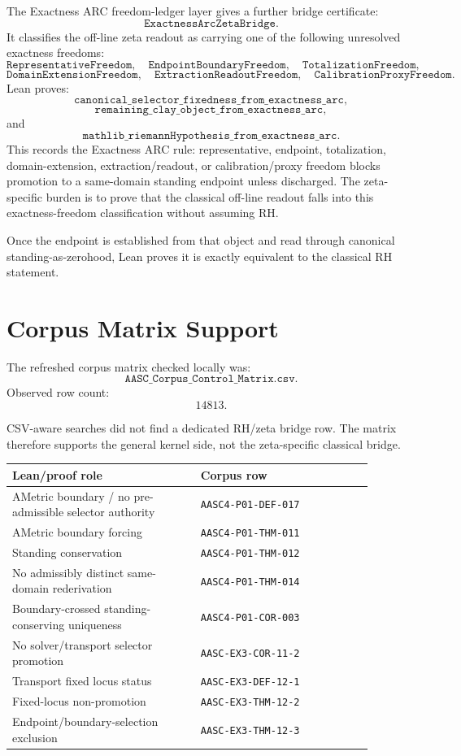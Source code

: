 \documentclass[11pt]{article}
\begin{document}
The Exactness ARC freedom-ledger layer gives a further bridge certificate:
\[
\texttt{ExactnessArcZetaBridge}.
\]
It classifies the off-line zeta readout as carrying one of the following
unresolved exactness freedoms:
\[
\texttt{RepresentativeFreedom},\quad
\texttt{EndpointBoundaryFreedom},\quad
\texttt{TotalizationFreedom},
\]
\[
\texttt{DomainExtensionFreedom},\quad
\texttt{ExtractionReadoutFreedom},\quad
\texttt{CalibrationProxyFreedom}.
\]
Lean proves:
\[
\texttt{canonical\_selector\_fixedness\_from\_exactness\_arc},
\]
\[
\texttt{remaining\_clay\_object\_from\_exactness\_arc},
\]
and
\[
\texttt{mathlib\_riemannHypothesis\_from\_exactness\_arc}.
\]
This records the Exactness ARC rule: representative, endpoint, totalization,
domain-extension, extraction/readout, or calibration/proxy freedom blocks
promotion to a same-domain standing endpoint unless discharged.  The
zeta-specific burden is to prove that the classical off-line readout falls into
this exactness-freedom classification without assuming RH.

Once the endpoint is established from that object and read through canonical
standing-as-zerohood, Lean proves it is exactly equivalent to the classical RH
statement.

\section{Corpus Matrix Support}

The refreshed corpus matrix checked locally was:
\[
\texttt{AASC\_Corpus\_Control\_Matrix.csv}.
\]
Observed row count:
\[
14813.
\]

CSV-aware searches did not find a dedicated RH/zeta bridge row.  The matrix
therefore supports the general kernel side, not the zeta-specific classical
bridge.

\begin{center}
\begin{tabular}{p{0.46\linewidth}p{0.42\linewidth}}
\toprule
Lean/proof role & Corpus row \\
\midrule
AMetric boundary / no pre-admissible selector authority
  & \texttt{AASC4-P01-DEF-017} \\
AMetric boundary forcing
  & \texttt{AASC4-P01-THM-011} \\
Standing conservation
  & \texttt{AASC4-P01-THM-012} \\
No admissibly distinct same-domain rederivation
  & \texttt{AASC4-P01-THM-014} \\
Boundary-crossed standing-conserving uniqueness
  & \texttt{AASC4-P01-COR-003} \\
No solver/transport selector promotion
  & \texttt{AASC-EX3-COR-11-2} \\
Transport fixed locus status
  & \texttt{AASC-EX3-DEF-12-1} \\
Fixed-locus non-promotion
  & \texttt{AASC-EX3-THM-12-2} \\
Endpoint/boundary-selection exclusion
  & \texttt{AASC-EX3-THM-12-3} \\
\bottomrule
\end{tabular}
\end{center}
\end{document}
